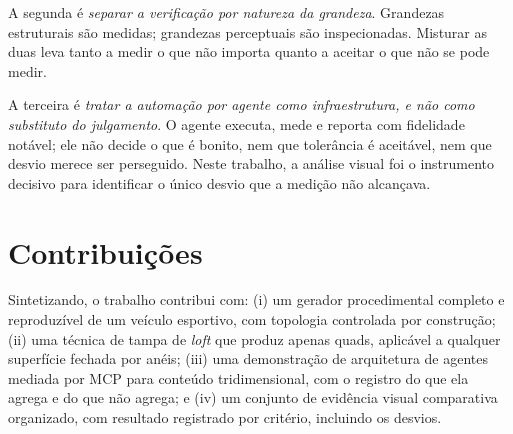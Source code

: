 A segunda \'e \emph{separar a verifica{\c{c}}\~ao por natureza da grandeza}. Grandezas
estruturais s\~ao medidas; grandezas perceptuais s\~ao inspecionadas. Misturar as duas
leva tanto a medir o que n\~ao importa quanto a aceitar o que n\~ao se pode medir.

A terceira \'e \emph{tratar a automa{\c{c}}\~ao por agente como infraestrutura, e n\~ao
como substituto do julgamento}. O agente executa, mede e reporta com fidelidade not\'avel;
ele n\~ao decide o que \'e bonito, nem que toler\^ancia \'e aceit\'avel, nem que
desvio merece ser perseguido. Neste trabalho, a an\'alise visual foi o instrumento
decisivo para identificar o \'unico desvio que a medi{\c{c}}\~ao n\~ao alcan{\c{c}}ava.

\section{Contribui{\c{c}}\~oes}

Sintetizando, o trabalho contribui com: (i) um gerador procedimental completo e
reproduz\'ivel de um ve\'iculo esportivo, com topologia controlada por constru{\c{c}}\~ao;
(ii) uma t\'ecnica de tampa de \emph{loft} que produz apenas quads, aplic\'avel a
qualquer superf\'icie fechada por an\'eis; (iii) uma demonstra{\c{c}}\~ao de arquitetura
de agentes mediada por MCP para conte\'udo tridimensional, com o registro do que ela
agrega e do que n\~ao agrega; e (iv) um conjunto de evid\^encia visual comparativa
organizado, com resultado registrado por crit\'erio, incluindo os desvios.
